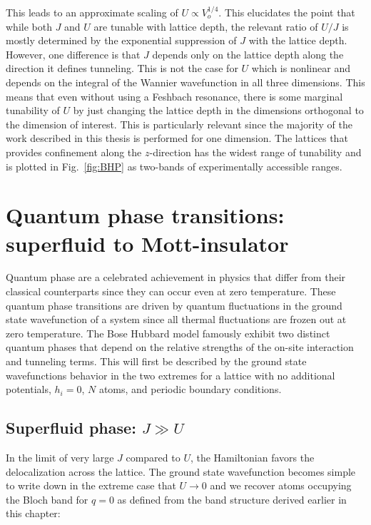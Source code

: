 	This leads to an approximate scaling of $U\propto V_o^{1/4}$. This elucidates the point that while both $J$ and $U$ are tunable with lattice depth, the relevant ratio of $U/J$ is mostly determined by the exponential suppression of $J$ with the lattice depth. However, one difference is that $J$ depends only on the lattice depth along the direction it defines tunneling. This is not the case for $U$ which is nonlinear and depends on the integral of the Wannier wavefunction in all three dimensions. This means that even without using a Feshbach resonance, there is some marginal tunability of $U$  by just changing the lattice depth in the dimensions orthogonal to the dimension of interest. This is particularly relevant since the majority of the work described in this thesis is performed for one dimension. The lattices that provides confinement along the $z$-direction has the widest range of tunability and is plotted in Fig.~\ref{fig:BHP} as two-bands of experimentally accessible ranges.



\section{Quantum phase transitions: superfluid to Mott-insulator}

Quantum phase are a celebrated achievement in physics that differ from their classical counterparts since they can occur even at zero temperature. These quantum phase transitions are driven by quantum fluctuations in the ground state wavefunction of a system since all thermal fluctuations are frozen out at zero temperature. The Bose Hubbard model famously exhibit two distinct quantum phases that depend on the relative strengths of the on-site interaction and tunneling terms. This will first be described by the ground state wavefunctions behavior in the two extremes for a lattice with no additional potentials, $h_i = 0$, $N$ atoms, and periodic boundary conditions.

\subsection{Superfluid phase: $J \gg U$}

In the limit of very large $J$ compared to $U$, the Hamiltonian favors the delocalization across the lattice. The ground state wavefunction becomes simple to write down in the extreme case that $U\rightarrow0$ and we recover atoms occupying the Bloch band for $q=0$ as defined from the band structure derived earlier in this chapter: 

